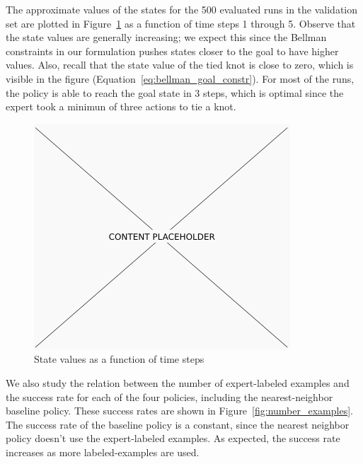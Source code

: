 The approximate values of the states for the 500 evaluated runs in the validation set are plotted in Figure~\ref{fig:values} as a function of time steps 1 through 5.
Observe that the state values are generally increasing; we expect this since the Bellman constraints in our formulation pushes states closer to the goal to have higher values.
Also, recall that the state value of the tied knot is close to zero, which is visible in the figure (Equation~\ref{eq:bellman_goal_constr}).
For most of the runs, the policy is able to reach the goal state in 3 steps, which is optimal since the expert took a minimun of three actions to tie a knot.

\begin{figure}[h!]
  \centering
    \includegraphics[width=0.9\linewidth]{figures/placeholder.png}
  \caption{State values as a function of time steps}
  \label{fig:values}
\end{figure}

We also study the relation between the number of expert-labeled examples and the success rate for each of the four policies, including the nearest-neighbor baseline policy.
These success rates are shown in Figure~\ref{fig:number_examples}.
The success rate of the baseline policy is a constant, since the nearest neighbor policy doesn't use the expert-labeled examples.
As expected, the success rate increases as more labeled-examples are used.

